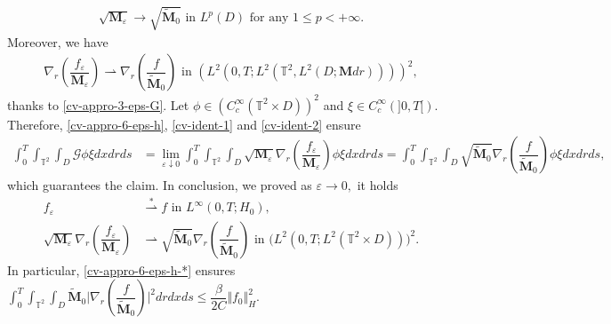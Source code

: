 \documentclass[a4paper,12pt, reqno]{amsart}
\begin{document}
   \begin{align}\label{cv-ident-1}
    \sqrt{\mathbf{M}_\varepsilon} \to \sqrt{\widetilde{\mathbf{M}}_0} \text{ in } L^p(D) \text{ for any }  1\leq p<+\infty.
   \end{align}Moreover,  we have 
   \begin{align}\label{cv-ident-2}
          \nabla_r(\dfrac{f_\varepsilon}{\mathbf{M}_\varepsilon}) \rightharpoonup \nabla_r(\dfrac{f}{\widetilde{\mathbf{M}}_0}) \text{ in } (L^2(0, T;L^2(\mathbb{T}^2,L^2(D;\mathbf{M}dr))))^2,
   \end{align}
     thanks to  \eqref{cv-appro-3-eps-G}. Let  $\phi\in (C^\infty_c(\mathbb{T}^2\times D))^2$ and $\xi\in C^\infty_c(]0,T[)$. Therefore,  \eqref{cv-appro-6-eps-h}, \eqref{cv-ident-1} and \eqref{cv-ident-2} ensure
     \begin{align*}
         \int_0^T \int_{\mathbb{T}^2}\int_D \mathcal{G}\phi\xi dxdrds &=\lim_{\varepsilon\downarrow 0}   \int_0^T \int_{\mathbb{T}^2}\int_D   \sqrt{\mathbf{M}_\varepsilon}\nabla_r(\dfrac{f_\varepsilon}{\mathbf{M}_\varepsilon})\phi\xi dxdrds=\int_0^T \int_{\mathbb{T}^2}\int_D\sqrt{\widetilde{\mathbf{M}}_0}\nabla_r(\dfrac{f}{\widetilde{\mathbf{M}}_0})\phi\xi dxdrds,
     \end{align*}
which guarantees the claim.
In conclusion, we proved
   as $\varepsilon \to 0,$ it holds
 \begin{align}
			f_\varepsilon&\overset{*}{\rightharpoonup} f \text{		in	}  L^\infty(0, T;H_0),\label{cv-appro-5-eps-h_*}\\
           \sqrt{\mathbf{M}_\varepsilon}\nabla_r(\dfrac{f_\varepsilon}{\mathbf{M}_\varepsilon}) &\rightharpoonup  \sqrt{\widetilde{\mathbf{M}}_0}\nabla_r(\dfrac{f}{\widetilde{\mathbf{M}}_0})  \text{  in }  \big(L^2(0, T;L^2(\mathbb{T}^2\times D))\big)^2.\label{cv-appro-6-eps-h-*}
	\end{align}
    In particular, \eqref{cv-appro-6-eps-h-*} ensures $\int_0^T\int_{\mathbb{T}^2}\int_D \widetilde{\mathbf{M}}_0\vert \nabla_r(\dfrac{f}{\widetilde{\mathbf{M}}_0})\vert^2 dr dx ds\leq \dfrac{\beta}{2C}\Vert f_0\Vert_H^2$.\\
    
\end{document}
